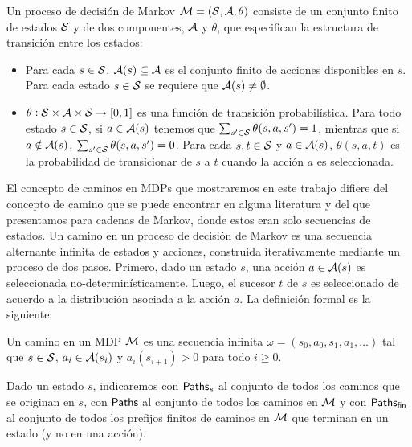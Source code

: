 
\begin{definition}
	Un proceso de decisión de Markov $\mathcal{M} =(\mathcal{S}, \mathcal{A}, \theta)$ consiste de un conjunto finito de estados $\mathcal{S}$ y de dos componentes, $\mathcal{A}$ y $\theta$, que especifican la estructura de transición entre los estados:
	\begin{itemize}
		\item Para cada $s \in \mathcal{S}$, $\mathcal{A}(s) \subseteq \mathcal{A}$ es el conjunto finito de
		      acciones disponibles en $s$. Para cada estado $s \in \mathcal{S}$ se requiere que
		      $\mathcal{A}(s) \neq \emptyset$. %
		\item $\theta : \mathcal{S} \times \mathcal{A} \times \mathcal{S} \rightarrow [0,1]$ es una función de transición probabilística. Para todo estado $s \in \mathcal{S}$, si $a \in \mathcal{A}(s)$ tenemos que $\sum_{s' \in \mathcal{S}} \theta(s, a, s') = 1$, mientras que si $a \notin \mathcal{A}(s)$, $\sum_{s' \in \mathcal{S}} \theta(s, a, s') = 0$. Para cada $s, t \in \mathcal{S}$ y $a \in \mathcal{A}(s)$, $\theta(s, a, t)$ es la probabilidad de transicionar de $s$ a $t$ cuando la acción $a$ es seleccionada.
	\end{itemize}
\end{definition}

El concepto de caminos en MDPs que mostraremos en este trabajo difiere del
concepto de camino que se puede encontrar en alguna literatura y del que
presentamos para cadenas de Markov, donde estos eran solo secuencias de
estados. Un camino en un proceso de decisión de Markov es una secuencia
alternante infinita de estados y acciones, construida iterativamente mediante
un proceso de dos pasos. Primero, dado un estado $s$, una acción $a \in
	\mathcal{A}(s)$ es seleccionada no-determinísticamente. Luego, el sucesor $t$ de $s$
es seleccionado de acuerdo a la distribución asociada a la acción $a$. La
definición formal es la siguiente:

\begin{definition}
	Un camino en un MDP $\mathcal{M}$ es una secuencia infinita $\omega = (s_0, a_0, s_1, a_1, \dots)$ tal que $s \in \mathcal{S}$, $a_i \in \mathcal{A}(s_i)$ y $a_i(s_{i+1}) > 0$ para todo $i \geq 0$.

	Dado un estado $s$, indicaremos con $\textsf{Paths}_s$ al conjunto de todos los caminos
	que se originan en $s$, con $\textsf{Paths}$ al conjunto de todos los caminos en $\mathcal{M}$ y
	con $\textsf{Paths}_\textsf{fin}$ al conjunto de todos los prefijos finitos de caminos en $\mathcal{M}$
	que terminan en un estado (y no en una acción).
\end{definition}

